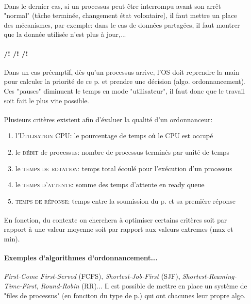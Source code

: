 {\paragraph{}
Dans le dernier cas, si un processus peut être interrompu avant son arrêt "normal" (tâche terminée, changement état volontaire), il faut mettre un place des mécanismes, par exemple: dans le cas de données partagées, il faut montrer que la donnée utilisée n'est plus à jour,...

\paragraph{/! /! /!}
Dans un cas préemptif, dès qu'un processus arrive, l'OS doit reprendre la main pour calculer la priorité de ce p. et prendre une décision (algo. ordonnancement). Ces "pauses" diminuent le temps en mode "utilisateur", il faut donc que le travail soit fait le plus vite possible.

\paragraph{}
Plusieurs critères existent afin d'évaluer la qualité d'un ordonnanceur:
\begin{enumerate}
\item l'\textsc{Utilisation CPU}: le pourcentage de temps où le CPU est occupé
\item le \textsc{débit} de processus: nombre de processus terminés par unité de temps
\item le \textsc{temps de rotation}: temps total écoulé pour l'exécution d'un processus
\item le \textsc{temps d'attente}: somme des temps d'attente en ready queue
\item \textsc{temps de réponse}: temps entre la soumission du p. et sa première réponse
\end{enumerate}

\paragraph{}
En fonction, du contexte on cherchera à optimiser certains critères soit par rapport à une valeur moyenne soit par rapport aux valeurs extremes (max et min).

\paragraph{Exemples d'algorithmes d'ordonnancement...}
\textit{First-Come First-Served} (FCFS), \textit{Shortest-Job-First} (SJF), \textit{Shortest-Reaming-Time-First}, \textit{Round-Robin} (RR)... Il est possible de mettre en place un système de "files de processus" (en fonciton du type de p.) qui ont chacunes leur propre algo.
}
